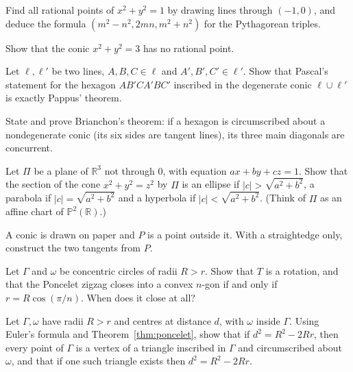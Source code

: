 \begin{exercise}[$\star$]\label{ex:pythagorean}
Find all rational points of $x^2+y^2=1$ by drawing lines through $(-1,0)$, and deduce the formula $(m^2-n^2,2mn,m^2+n^2)$ for the Pythagorean triples.
\end{exercise}

\begin{exercise}[$\star$]\label{ex:nothree}
Show that the conic $x^2+y^2=3$ has no rational point.
\end{exercise}

\begin{exercise}[$\star$]\label{ex:pascalpappus}
Let $\ell,\ell'$ be two lines, $A,B,C\in\ell$ and $A',B',C'\in\ell'$. Show that Pascal's statement for the hexagon $AB'CA'BC'$ inscribed in the
degenerate conic $\ell\cup\ell'$ is exactly Pappus' theorem.
\end{exercise}

\begin{exercise}[$\star$]\label{ex:brianchon}
State and prove Brianchon's theorem: if a hexagon is circumscribed about a nondegenerate conic (its six sides are tangent lines), its three main
diagonals are concurrent.
\end{exercise}

\begin{exercise}[$\star\star$]\label{ex:conesection}
Let $\Pi$ be a plane of $\mathbb R^3$ not through $0$, with equation $ax+by+cz=1$. Show that the section of the cone $x^2+y^2=z^2$ by $\Pi$ is an ellipse
if $|c|>\sqrt{a^2+b^2}$, a parabola if $|c|=\sqrt{a^2+b^2}$ and a hyperbola if $|c|<\sqrt{a^2+b^2}$. (Think of $\Pi$ as an affine chart of
$\mathbb P^2(\mathbb R)$.)
\end{exercise}

\begin{exercise}[$\star\star$]\label{ex:tangentconstruct}
A conic is drawn on paper and $P$ is a point outside it. With a straightedge only, construct the two tangents from $P$.
\end{exercise}

\begin{exercise}[$\star$]\label{ex:concentric}
Let $\Gamma$ and $\omega$ be concentric circles of radii $R>r$. Show that $T$ is a rotation, and that the Poncelet zigzag closes into a convex $n$-gon
if and only if $r=R\cos(\pi/n)$. When does it close at all?
\end{exercise}

\begin{exercise}[$\star\star$]\label{ex:chappleeuler}
Let $\Gamma,\omega$ have radii $R>r$ and centres at distance $d$, with $\omega$ inside $\Gamma$. Using Euler's formula and Theorem~\ref{thm:poncelet},
show that if $d^2=R^2-2Rr$, then every point of $\Gamma$ is a vertex of a triangle inscribed in $\Gamma$ and circumscribed about $\omega$, and that if
one such triangle exists then $d^2=R^2-2Rr$.
\end{exercise}

